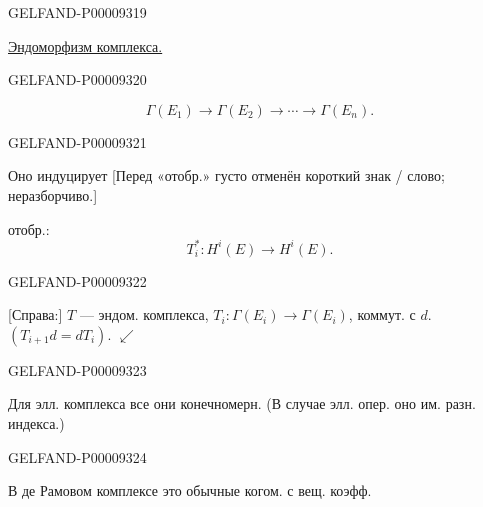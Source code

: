 \begin{GelfandAdjacentEvidence}{GELFAND-P000093}{19}

\underline{Эндоморфизм комплекса.}
\end{GelfandAdjacentEvidence}
\begin{GelfandAdjacentEvidence}{GELFAND-P000093}{20}

\begin{equation*}
\Gamma(E_1)\longrightarrow\Gamma(E_2)\longrightarrow\cdots\longrightarrow\Gamma(E_n).
\end{equation*}
\end{GelfandAdjacentEvidence}
\begin{GelfandAdjacentEvidence}{GELFAND-P000093}{21}

Оно индуцирует
[Перед «отобр.» густо отменён короткий знак / слово; неразборчиво.]

отобр.:
\begin{equation*}T_i^*:H^i(E)\longrightarrow H^i(E).\end{equation*}
\end{GelfandAdjacentEvidence}
\begin{GelfandAdjacentEvidence}{GELFAND-P000093}{22}

[Справа:] $T$ — эндом. комплекса,
$T_i:\Gamma(E_i)\to\Gamma(E_i)$, коммут. с $d$.
$(T_{i+1}d=dT_i)$.
$\swarrow$
\end{GelfandAdjacentEvidence}
\begin{GelfandAdjacentEvidence}{GELFAND-P000093}{23}

Для элл. комплекса все они конечномерн.
(В случае элл. опер. оно им. разн. индекса.)
\end{GelfandAdjacentEvidence}
\begin{GelfandAdjacentEvidence}{GELFAND-P000093}{24}

В де Рамовом комплексе это обычные когом. с вещ. коэфф.
\end{GelfandAdjacentEvidence}
